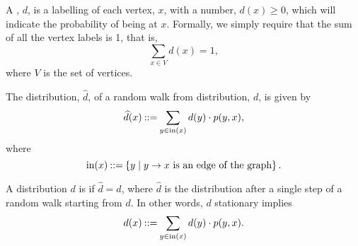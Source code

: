 \documentclass[11pt,twoside]{article}
\begin{document}
A , $d$, is a labelling of each vertex, $x$, with a
number, $d(x) \geq 0$, which will indicate the probability of being at $x$.
Formally, we simply require that the sum of all the vertex labels is 1,
that is,
\[
\sum_{x \in V} d(x) = 1,
\]
where $V$ is the set of vertices.

The distribution, $\widehat{d}$,  of a random walk from
distribution, $d$, is given by
\[
\widehat{d}(x) \mathbin{::=} \sum_{y \in \text{in}(x)} d(y) \cdot p(y,x),
\]
where
\[
\text{in}(x) \mathbin{::=} \left\{y \mid y \to x \text{ is an edge of the
    graph}\right\}.
\]

A distribution $d$ is  if $\widehat{d} = d$, where 
$\widehat{d}$ is the distribution after a single step of a random walk
starting from $d$.
In other words, $d$ stationary implies
\[
d(x) \mathbin{::=} \sum_{y \in \text{in}(x)} d(y) \cdot p(y,x).
\]
\end{document}

